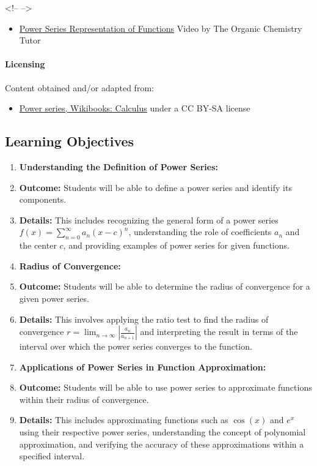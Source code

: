 <!-- -->



\begin{itemize}
    \item \href{https://www.youtube.com/watch?v=54yldObvvwY}{Power Series Representation of Functions} Video by The Organic Chemistry Tutor
\end{itemize}

\paragraph{Licensing}



Content obtained and/or adapted from:



\begin{itemize}
    \item \href{https://en.wikibooks.org/wiki/Calculus/Power_series}{Power series, Wikibooks: Calculus} under a CC BY-SA license
\end{itemize}

\subsection{Learning Objectives}

\begin{enumerate}
    \item \textbf{Understanding the Definition of Power Series:}
    \item \textbf{Outcome:} Students will be able to define a power series and identify its components.
    \item \textbf{Details:} This includes recognizing the general form of a power series \( f(x)=\sum_{n=0}^\infty a_n (x-c)^n \), understanding the role of coefficients \(a_n\) and the center \(c\), and providing examples of power series for given functions.
    \item \textbf{Radius of Convergence:}
    \item \textbf{Outcome:} Students will be able to determine the radius of convergence for a given power series.
    \item \textbf{Details:} This involves applying the ratio test to find the radius of convergence \(r = \lim_{n \to \infty} \left| \frac{a_n}{a_{n+1}} \right| \) and interpreting the result in terms of the interval over which the power series converges to the function.
    \item \textbf{Applications of Power Series in Function Approximation:}
    \item \textbf{Outcome:} Students will be able to use power series to approximate functions within their radius of convergence.
    \item \textbf{Details:} This includes approximating functions such as \( \cos(x) \) and \( e^x \) using their respective power series, understanding the concept of polynomial approximation, and verifying the accuracy of these approximations within a specified interval.
\end{enumerate}

